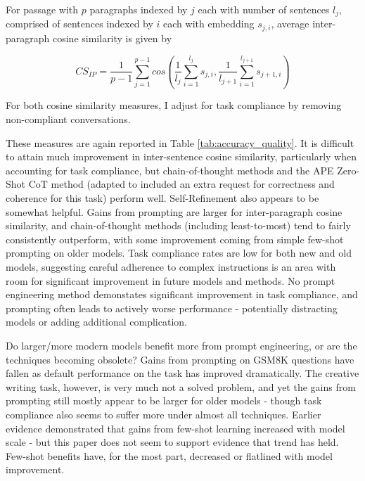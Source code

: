 \documentclass[11pt]{article}
\begin{document}
For passage with $p$ paragraphs indexed by $j$ each with number of sentences $l_{j}$, comprised of sentences indexed by $i$ each with embedding $s_{j,i}$, average inter-paragraph cosine similarity is given by

\tiny $$CS_{IP}=\frac{1}{p-1}\sum_{j=1}^{p-1}cos(\frac{1}{l_{j}}\sum_{i=1}^{l_{j}}s_{j,i},\frac{1}{l_{j+1}}\sum_{i=1}^{l_{j+1}}s_{j+1,i})$$ \normalsize

For both cosine similarity measures, I adjust for task compliance by removing non-compliant conversations.

These measures are again reported in Table \ref{tab:accuracy_quality}. It is difficult to attain much improvement in inter-sentence cosine similarity, particularly when accounting for task compliance, but chain-of-thought methods and the APE Zero-Shot CoT method (adapted to included an extra request for correctness and coherence for this task) perform well. Self-Refinement also appears to be somewhat helpful. Gains from prompting are larger for inter-paragraph cosine similarity, and chain-of-thought methods (including least-to-most) tend to fairly consistently outperform, with some improvement coming from simple few-shot prompting on older models. Task compliance rates are low for both new and old models, suggesting careful adherence to complex instructions is an area with room for significant improvement in future models and methods. No prompt engineering method demonstates significant improvement in task compliance, and prompting often leads to actively worse performance - potentially distracting models or adding additional complication.

Do larger/more modern models benefit more from prompt engineering, or are the techniques becoming obsolete? Gains from prompting on GSM8K questions have fallen as default performance on the task has improved dramatically. The creative writing task, however, is very much not a solved problem, and yet the gains from prompting still mostly appear to be larger for older models - though task compliance also seems to suffer more under almost all techniques. Earlier evidence demonstrated that gains from few-shot learning increased with model scale - but this paper does not seem to support evidence that trend has held. \cite{brown_language_2020} Few-shot benefits have, for the most part, decreased or flatlined with model improvement.
\end{document}
